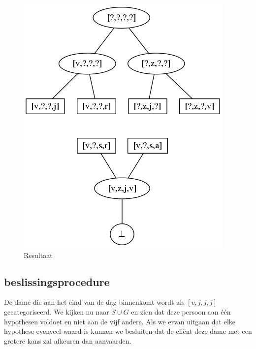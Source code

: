 \documentclass[alternative-exam.tex]{subfiles}
\begin{document}
\begin{figure}
[H]
\centering
\caption{Resultaat}
\label{resultaat}
\includegraphics[scale=0.5]{resources/graphs/resultaat.png}
\end{figure}


\subsection{beslissingsprocedure}
De dame die aan het eind van de dag binnenkomt wordt als $[v,j,j,j]$ gecategoriseerd.
We kijken nu naar $S\cup G$ en zien dat deze persoon aan \'e\'en hypothesen voldoet en niet aan de vijf andere. Als we ervan uitgaan dat elke hypothese evenveel waard is kunnen we besluiten dat de cli\"ent deze dame met een grotere kans zal afkeuren dan aanvaarden.
\end{document}
